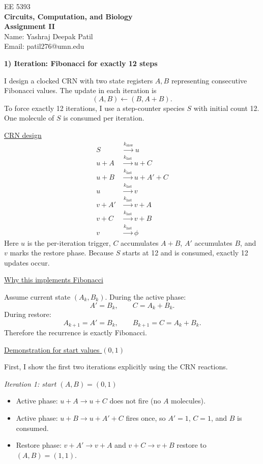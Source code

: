 \documentclass[12pt]{article}
\begin{document}
\begin{center}
EE 5393 \\
\textbf{Circuits, Computation, and Biology}\\
\textbf{Assignment II}\\
\vspace{0.3cm}
Name: Yashraj Deepak Patil \\
Email: patil276@umn.edu\\

\end{center}
\vspace{0.25mm}

\noindent\textbf{1) Iteration: Fibonacci for exactly 12 steps}

\medskip
I design a clocked CRN with two state registers $A,B$ representing consecutive Fibonacci values. The update in each iteration is
\[
(A,B) \leftarrow (B, A+B).
\]
To force exactly 12 iterations, I use a step-counter species $S$ with initial count 12. One molecule of $S$ is consumed per iteration.

\medskip
\noindent\underline{CRN design}
\begin{align*}
S &\xrightarrow{k_{\text{slow}}} u \\
u + A &\xrightarrow{k_{\text{fast}}} u + C \\
u + B &\xrightarrow{k_{\text{fast}}} u + A' + C \\
u &\xrightarrow{k_{\text{fast}}} v \\
v + A' &\xrightarrow{k_{\text{fast}}} v + A \\
v + C &\xrightarrow{k_{\text{fast}}} v + B \\
v &\xrightarrow{k_{\text{fast}}} \phi
\end{align*}
Here $u$ is the per-iteration trigger, $C$ accumulates $A+B$, $A'$ accumulates $B$, and $v$ marks the restore phase. Because $S$ starts at 12 and is consumed, exactly 12 updates occur.

\medskip
\noindent\underline{Why this implements Fibonacci}

Assume current state $(A_k,B_k)$. During the active phase:
\[
A' = B_k, \qquad C = A_k + B_k.
\]
During restore:
\[
A_{k+1} = A' = B_k, \qquad B_{k+1} = C = A_k + B_k.
\]
Therefore the recurrence is exactly Fibonacci.

\medskip
\noindent\underline{Demonstration for start values $(0,1)$}

First, I show the first two iterations explicitly using the CRN reactions.

\medskip
\noindent\textit{Iteration 1: start $(A,B)=(0,1)$}
\begin{itemize}
\item Active phase: $u + A \to u + C$ does not fire (no $A$ molecules).
\item Active phase: $u + B \to u + A' + C$ fires once, so $A'=1$, $C=1$, and $B$ is consumed.
\item Restore phase: $v + A' \to v + A$ and $v + C \to v + B$ restore to $(A,B)=(1,1)$.
\end{itemize}
\end{document}
